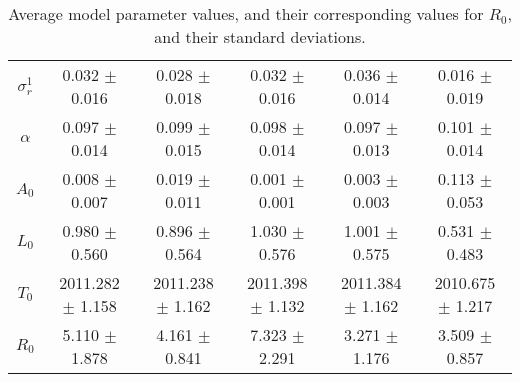 \begin{sidewaystable}
\begin{tabular}{cccccc}
{\bf $\sigma^1_r$} & 0.032 $\pm$ 0.016 & 0.028 $\pm$ 0.018 & 0.032 $\pm$ 0.016 & 0.036 $\pm$ 0.014 & 0.016 $\pm$ 0.019 \\
{\bf $\alpha$} & 0.097 $\pm$ 0.014 & 0.099 $\pm$ 0.015 & 0.098 $\pm$ 0.014 & 0.097 $\pm$ 0.013 & 0.101 $\pm$ 0.014 \\
{\bf $A_0$} & 0.008 $\pm$ 0.007 & 0.019 $\pm$ 0.011 & 0.001 $\pm$ 0.001 & 0.003 $\pm$ 0.003 & 0.113 $\pm$ 0.053 \\
{\bf $L_0$} & 0.980 $\pm$ 0.560 & 0.896 $\pm$ 0.564 & 1.030 $\pm$ 0.576 & 1.001 $\pm$ 0.575 & 0.531 $\pm$ 0.483 \\
{\bf $T_0$} & 2011.282 $\pm$ 1.158 & 2011.238 $\pm$ 1.162 & 2011.398 $\pm$ 1.132 & 2011.384 $\pm$ 1.162 & 2010.675 $\pm$ 1.217 \\
{\bf $R_0$} & 5.110 $\pm$ 1.878& 4.161 $\pm$ 0.841& 7.323 $\pm$ 2.291& 3.271 $\pm$ 1.176& 3.509 $\pm$ 0.857\\
\hline\hline
\end{tabular}
\caption{Average model parameter values, and their corresponding values for $R_0$, and their standard deviations.}
\label{Table:Parameter_Values}
\end{sidewaystable}
